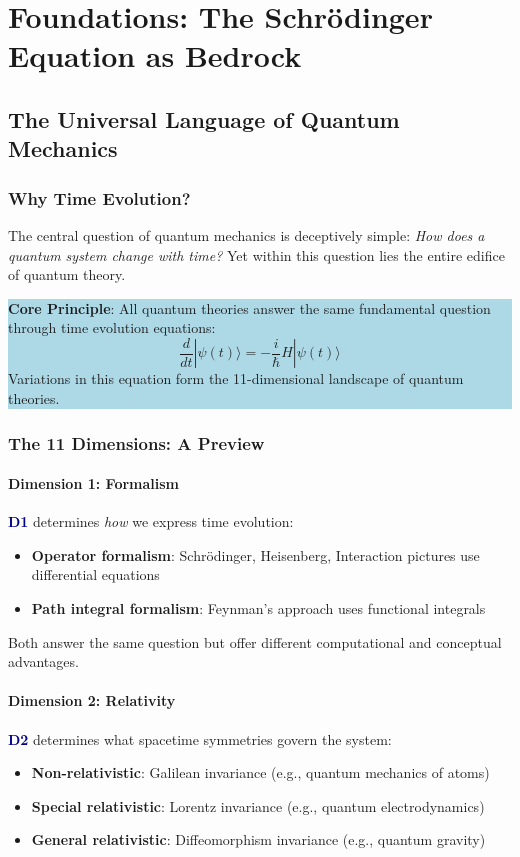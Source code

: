 \documentclass[12pt,openany,oneside]{book}
\newcommand{\dimensionindex}[1]{\textcolor{darkblue}{\textbf{D#1}}}
\newcommand{\importantbox}[1]{%
  \colorbox{lightblue}{\begin{minipage}{\linewidth-2\fboxsep}
    #1
  \end{minipage}}%
}
\newcommand{\ket}[1]{|#1\rangle}
\begin{document}
\newpage
\tableofcontents

\mainmatter

\part{Foundations: The Schrödinger Equation as Bedrock}

\chapter{The Universal Language of Quantum Mechanics}

\section{Why Time Evolution?}

The central question of quantum mechanics is deceptively simple: \textit{How does a quantum system change with time?} Yet within this question lies the entire edifice of quantum theory.

\importantbox{
\textbf{Core Principle}: All quantum theories answer the same fundamental question through time evolution equations:
\[
\frac{d}{dt}\ket{\psi(t)} = -\frac{i}{\hbar}H\ket{\psi(t)}
\]
Variations in this equation form the 11-dimensional landscape of quantum theories.
}

\section{The 11 Dimensions: A Preview}

\subsection{Dimension 1: Formalism}
\dimensionindex{1} determines \textit{how} we express time evolution:
\begin{itemize}
  \item \textbf{Operator formalism}: Schrödinger, Heisenberg, Interaction pictures use differential equations
  \item \textbf{Path integral formalism}: Feynman's approach uses functional integrals
\end{itemize}

Both answer the same question but offer different computational and conceptual advantages.

\subsection{Dimension 2: Relativity}
\dimensionindex{2} determines what spacetime symmetries govern the system:
\begin{itemize}
  \item \textbf{Non-relativistic}: Galilean invariance (e.g., quantum mechanics of atoms)
  \item \textbf{Special relativistic}: Lorentz invariance (e.g., quantum electrodynamics)
  \item \textbf{General relativistic}: Diffeomorphism invariance (e.g., quantum gravity)
\end{itemize}
\end{document}
